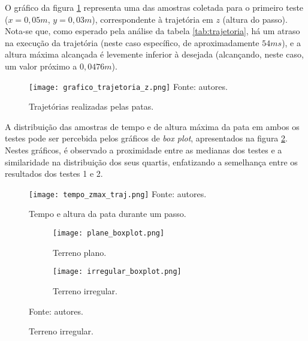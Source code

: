 \documentclass[../main.tex]{subfiles}
\begin{document}
  O gráfico da figura \ref{fig:grafico_trajetoria_xyz} representa uma das amostras coletada para o primeiro teste ($x=0,05m$, $y=0,03m$), correspondente à trajetória em $z$ (altura do passo). Nota-se que, como esperado pela análise da tabela \ref{tab:trajetoria}, há um atraso na execução da trajetória (neste caso específico, de aproximadamente $54ms$), e a altura máxima alcançada é levemente inferior à desejada (alcançando, neste caso, um valor próximo a $0,0476m$).
  
  \vspace{-0.4\baselineskip}
  
  \begin{figure}[!htb]
    \centering
    \caption{Trajetórias realizadas pelas patas.}
    \texttt{[image: grafico\_trajetoria\_z.png]}
    Fonte: autores.
    \label{fig:grafico_trajetoria_xyz}
  \end{figure}
  \vspace{-0.4\baselineskip}

  A distribuição das amostras de tempo e de altura máxima da pata em ambos os testes pode ser percebida pelos gráficos de \textit{box plot}, apresentados na figura \ref{fig:time_zmax_traj}. Nestes gráficos, é observado a proximidade entre as medianas dos testes e a similaridade na distribuição dos seus quartis, enfatizando a semelhança entre os resultados dos testes 1 e 2.

  \begin{figure}[!htb]
    \centering
    \caption{Tempo e altura da pata durante um passo.}
    \texttt{[image: tempo\_zmax\_traj.png]}
    Fonte: autores.
    \label{fig:time_zmax_traj}
  \end{figure}

  \begin{figure}[!htb]
    \centering
    \caption{Oscilação do corpo em ambos os tipos de terreno.}
    \begin{subfigure}[t]{0.49\textwidth}
      \centering
      \texttt{[image: plane\_boxplot.png]}
      \caption{Terreno plano.}
      \label{fig:imu_test_plane}
    \end{subfigure}
    \begin{subfigure}[t]{0.49\textwidth}
      \centering
      \texttt{[image: irregular\_boxplot.png]}
      \caption{Terreno irregular.}
      \label{fig:imu_test_irregular}
    \end{subfigure}
    Fonte: autores.
    \vspace{-\baselineskip}
    \label{fig:imu_test}
  \end{figure}
\end{document}
